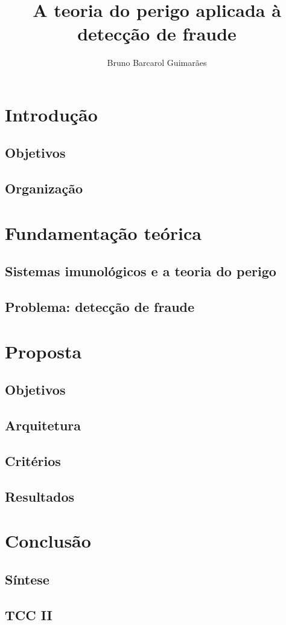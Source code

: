 \documentclass{article}
\title{A teoria do perigo aplicada à detecção de fraude}
\author{Bruno Barcarol Guimarães}
\begin{document}
\maketitle
\newpage

\tableofcontents{}
\newpage

\section{Introdução}
\subsection{Objetivos}
\subsection{Organização}
\newpage
\section{Fundamentação teórica}
\subsection{Sistemas imunológicos e a teoria do perigo}
\subsection{Problema: detecção de fraude}
\section{Proposta}
\subsection{Objetivos}
\subsection{Arquitetura}
\subsection{Critérios}
\subsection{Resultados}
\section{Conclusão}
\subsection{Síntese}
\subsection{TCC II}
\end{document}
